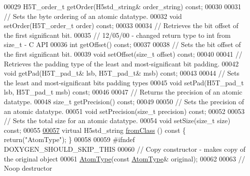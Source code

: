 \begin{DoxyCode}
00029         H5T\_order\_t getOrder(H5std\_string& order\_string) \textcolor{keyword}{const};
00030 
00031         \textcolor{comment}{// Sets the byte ordering of an atomic datatype.}
00032         \textcolor{keywordtype}{void} setOrder(H5T\_order\_t order) \textcolor{keyword}{const};
00033 
00034         \textcolor{comment}{// Retrieves the bit offset of the first significant bit.}
00035         \textcolor{comment}{// 12/05/00 - changed return type to int from size\_t - C API}
00036         \textcolor{keywordtype}{int} getOffset() \textcolor{keyword}{const};
00037 
00038         \textcolor{comment}{// Sets the bit offset of the first significant bit.}
00039         \textcolor{keywordtype}{void} setOffset(\textcolor{keywordtype}{size\_t} offset) \textcolor{keyword}{const};
00040 
00041         \textcolor{comment}{// Retrieves the padding type of the least and most-significant bit padding.}
00042         \textcolor{keywordtype}{void} getPad(H5T\_pad\_t& lsb, H5T\_pad\_t& msb) \textcolor{keyword}{const};
00043 
00044         \textcolor{comment}{// Sets the least and most-significant bits padding types}
00045         \textcolor{keywordtype}{void} setPad(H5T\_pad\_t lsb, H5T\_pad\_t msb) \textcolor{keyword}{const};
00046 
00047         \textcolor{comment}{// Returns the precision of an atomic datatype.}
00048         \textcolor{keywordtype}{size\_t} getPrecision() \textcolor{keyword}{const};
00049 
00050         \textcolor{comment}{// Sets the precision of an atomic datatype.}
00051         \textcolor{keywordtype}{void} setPrecision(\textcolor{keywordtype}{size\_t} precision) \textcolor{keyword}{const};
00052 
00053         \textcolor{comment}{// Sets the total size for an atomic datatype.}
00054         \textcolor{keywordtype}{void} setSize(\textcolor{keywordtype}{size\_t} size) \textcolor{keyword}{const};
00055 
\hyperlink{class_h5_1_1_atom_type_a78b16fea33b398b689fd8c8512f59f49}{00057}         \textcolor{keyword}{virtual} H5std\_string \hyperlink{class_h5_1_1_atom_type_a78b16fea33b398b689fd8c8512f59f49}{fromClass} ()\textcolor{keyword}{ const }\{ \textcolor{keywordflow}{return}(\textcolor{stringliteral}{"AtomType"}); \}
00058 
00059 \textcolor{preprocessor}{#ifndef DOXYGEN\_SHOULD\_SKIP\_THIS}
00060         \textcolor{comment}{// Copy constructor - makes copy of the original object}
00061         \hyperlink{class_h5_1_1_atom_type}{AtomType}(\textcolor{keyword}{const} \hyperlink{class_h5_1_1_atom_type}{AtomType}& original);
00062 
00063         \textcolor{comment}{// Noop destructor}

\end{DoxyCode}
